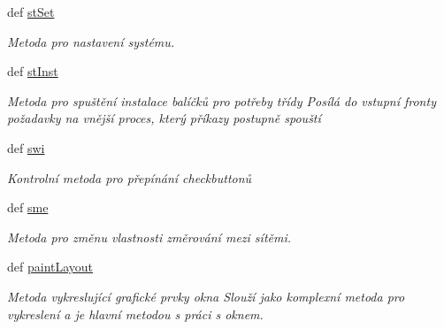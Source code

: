 \begin{DoxyCompactItemize}
def \hyperlink{classcloseSetup_1_1App_a371a8cb0f96f6960e4786c77975288f1}{st\-Set}
\begin{DoxyCompactList}\small\item\em Metoda pro nastavení systému. \end{DoxyCompactList}\item 
def \hyperlink{classcloseSetup_1_1App_abec84cf3637759925e510a5f66de1567}{st\-Inst}
\begin{DoxyCompactList}\small\item\em Metoda pro spuštění instalace balíčků pro potřeby třídy Posílá do vstupní fronty požadavky na vnější proces, který příkazy postupně spouští \end{DoxyCompactList}\item 
def \hyperlink{classcloseSetup_1_1App_ad423eb22965d036bfc941a3d1f5eefc0}{swi}
\begin{DoxyCompactList}\small\item\em Kontrolní metoda pro přepínání checkbuttonů \end{DoxyCompactList}\item 
def \hyperlink{classcloseSetup_1_1App_ab6981aced3f923450b62a2ccfae0c886}{sme}
\begin{DoxyCompactList}\small\item\em Metoda pro změnu vlastnosti změrování mezi sítěmi. \end{DoxyCompactList}\item 
def \hyperlink{classcloseSetup_1_1App_ac26a170acd7324f1667666842047a92b}{paint\-Layout}
\begin{DoxyCompactList}\small\item\em Metoda vykreslující grafické prvky okna Slouží jako komplexní metoda pro vykreslení a je hlavní metodou s práci s oknem. \end{DoxyCompactList}\end{DoxyCompactItemize}
